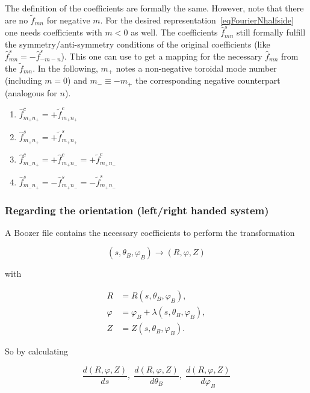 \documentclass{article}
\begin{document}
The definition of the coefficients are formally the same. However, note that there are no $\tilde{f}_{mn}$ for negative $m$. For the desired representation~\ref{eqFourierNhalfside} one needs coefficients with $m<0$ as well. The coefficients $\hat{f}^s_{mn}$ still formally fulfill the symmetry/anti-symmetry conditions of the original coefficients (like $\hat{f}^s_{mn} = -\hat{f}^s_{-m-n}$). This one can use to get a mapping for the necessary $\hat{f}_{mn}$ from the $\tilde{f}_{mn}$. In the following, $m_+$ notes a non-negative toroidal mode number (including $m=0$) and $m_- \equiv -m_+$ the corresponding negative counterpart (analogous for $n$).

\begin{enumerate}
	\item $\hat{f}^c_{m_+n_+} = +\tilde{f}^c_{m_+n_+}$
	\item $\hat{f}^s_{m_+n_+} = +\tilde{f}^s_{m_+n_+}$
	\item $\hat{f}^c_{m_-n_+} = +\hat{f}^c_{m_+n_-} = +\tilde{f}^c_{m_+n_-}$
	\item $\hat{f}^s_{m_-n_+} = -\hat{f}^s_{m_+n_-} = -\tilde{f}^s_{m_+n_-}$
\end{enumerate}



\subsubsection{Regarding the orientation (left/right handed system)}
A Boozer file contains the necessary coefficients to perform the transformation 

\begin{equation*}
    (s,\theta_B,\varphi_B) \to (R,\varphi,Z)
\end{equation*}

with

\begin{align*}
    R &= R(s, \theta_B, \varphi_B), \\
    \varphi &= \varphi_B + \lambda(s, \theta_B, \varphi_B), \\
    Z &= Z(s, \theta_B, \varphi_B).
\end{align*}

So by calculating

\begin{equation*}
	\frac{d(R,\varphi,Z)}{ds},\; \frac{d(R,\varphi,Z)}{d\theta_B},\; \frac{d(R,\varphi,Z)}{d\varphi_B}
\end{equation*}
\end{document}
